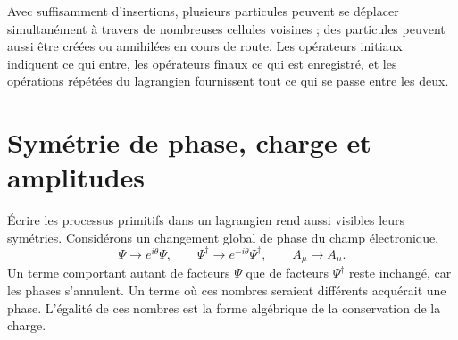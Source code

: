 \begin{classroomqa}
\end{classroomqa}

Avec suffisamment d’insertions, plusieurs particules peuvent se déplacer simultanément à travers de nombreuses cellules voisines ; des particules peuvent aussi être créées ou annihilées en cours de route. Les opérateurs initiaux indiquent ce qui entre, les opérateurs finaux ce qui est enregistré, et les opérations répétées du lagrangien fournissent tout ce qui se passe entre les deux.

\begin{classroomqa}
\end{classroomqa}

\section{Symétrie de phase, charge et amplitudes}

Écrire les processus primitifs dans un lagrangien rend aussi visibles leurs symétries. Considérons un changement global de phase du champ électronique,
\begin{equation}
\Psi\longrightarrow e^{i\theta}\Psi,
\qquad
\Psi^\dagger\longrightarrow e^{-i\theta}\Psi^\dagger,
\qquad
A_\mu\longrightarrow A_\mu.
\end{equation}
Un terme comportant autant de facteurs \(\Psi\) que de facteurs \(\Psi^\dagger\) reste inchangé, car les phases s’annulent. Un terme où ces nombres seraient différents acquérait une phase. L’égalité de ces nombres est la forme algébrique de la conservation de la charge.

